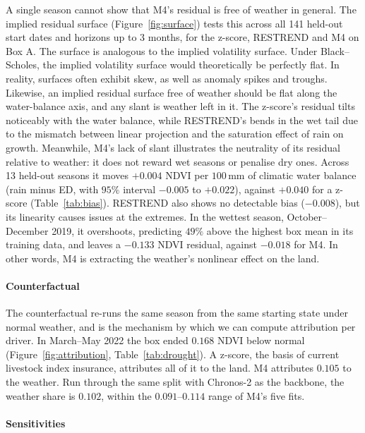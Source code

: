 \documentclass[letterpaper]{article} %
\begin{document}
A single season cannot show that M4's residual is free of weather in general. The implied residual surface (Figure~\ref{fig:surface}) tests this across all 141 held-out start dates and horizons up to 3 months, for the z-score, RESTREND and M4 on Box A. The surface is analogous to the implied volatility surface. Under Black--Scholes, the implied volatility surface would theoretically be perfectly flat. In reality, surfaces often exhibit skew, as well as anomaly spikes and troughs. Likewise, an implied residual surface free of weather should be flat along the water-balance axis, and any slant is weather left in it. The z-score's residual tilts noticeably with the water balance, while RESTREND's bends in the wet tail due to the mismatch between linear projection and the saturation effect of rain on growth. Meanwhile, M4's lack of slant illustrates the neutrality of its residual relative to weather: it does not reward wet seasons or penalise dry ones. Across 13 held-out seasons it moves $+0.004$ NDVI per $100$\,mm of climatic water balance (rain minus ED, with $95\%$ interval $-0.005$ to $+0.022$), against $+0.040$ for a z-score (Table~\ref{tab:bias}). RESTREND also shows no detectable bias ($-0.008$), but its linearity causes issues at the extremes. In the wettest season, October--December 2019, it overshoots, predicting $49\%$ above the highest box mean in its training data, and leaves a $-0.133$ NDVI residual, against $-0.018$ for M4. In other words, M4 is extracting the weather's nonlinear effect on the land.

\paragraph{Counterfactual}

The counterfactual re-runs the same season from the same starting state under normal weather, and is the mechanism by which we can compute attribution per driver. In March--May 2022 the box ended $0.168$ NDVI below normal (Figure~\ref{fig:attribution}, Table~\ref{tab:drought}). A z-score, the basis of current livestock index insurance, attributes all of it to the land. M4 attributes $0.105$ to the weather. Run through the same split with Chronos-2 as the backbone, the weather share is $0.102$, within the $0.091$--$0.114$ range of M4's five fits.

\paragraph{Sensitivities}
\end{document}
